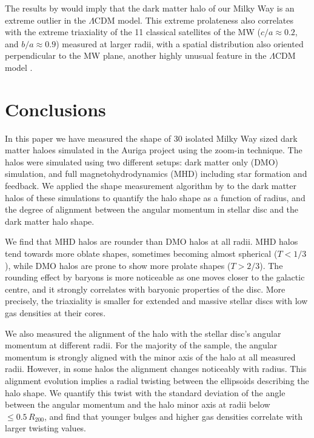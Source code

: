 \documentclass[usenatbib]{mnras}
\begin{document}
The results by \citet{LM10} would imply that the dark matter halo of our Milky
Way is an extreme outlier in the $\Lambda$CDM model. 
This extreme prolateness also correlates with the extreme triaxiality
of the 11 classical satellites of the MW ($c/a\approx 0.2$, and
$b/a\approx0.9$) measured at larger radii, with a spatial
distribution  also oriented perpendicular to the MW plane, another
highly unusual feature in the $\Lambda$CDM model \citep{2018MNRAS.478.5533F}. 






\section{Conclusions}
\label{sec:conclusions}

In this paper we have measured the shape of 30 isolated Milky Way sized
dark matter haloes simulated in the Auriga project using the zoom-in
technique. The halos were simulated using two different setups:
dark matter only (DMO) simulation, and full magnetohydrodynamics (MHD)
including star formation and feedback.
We applied the shape measurement algorithm by \cite{Allgood06} to the
dark matter halos of these simulations to quantify the halo shape as a
function of radius, and the degree of alignment between the angular
momentum in stellar disc and the dark matter halo shape. 

We find that MHD halos are rounder than DMO halos at all radii.
MHD halos tend towards more oblate shapes, sometimes becoming almost spherical
($T<1/3$), while DMO halos are prone to show more prolate shapes ($T>2/3$).  
The rounding effect by baryons is more noticeable as one moves closer to the galactic
centre, and it strongly  correlates with baryonic properties of the disc.
More precisely, the triaxiality is smaller for extended and massive
stellar discs with low gas densities at their cores.

We also measured the alignment of the halo with the stellar disc's angular
momentum at different radii. For the majority of the sample, the angular momentum
is strongly aligned with the minor axis of the halo at all measured radii.
However, in some halos the alignment changes noticeably with radius. 
This alignment evolution implies a radial twisting between the ellipsoids
describing the halo shape. We quantify this twist with the standard deviation of the angle
between the angular momentum and the halo minor axis at radii below
$\leq 0.5\, R_{200}$, and find that younger bulges and higher gas
densities correlate with larger twisting values. 
\end{document}
